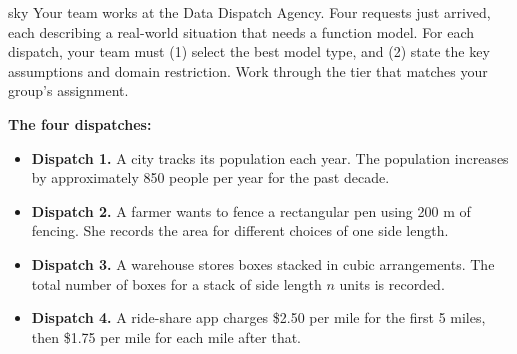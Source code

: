 \documentclass[10pt]{article}
\begin{document}
\namepartnerperiod

\vspace{0.08in}

\begin{scenariobox}{sky}
\small
Your team works at the Data Dispatch Agency. Four requests just arrived, each describing a
real-world situation that needs a function model. For each dispatch, your team must (1) select
the best model type, and (2) state the key assumptions and domain restriction. Work through
the tier that matches your group's assignment.
\end{scenariobox}

\vspace{0.08in}

\textbf{The four dispatches:}

\begin{itemize}[itemsep=3pt]
  \item \textbf{Dispatch 1.} A city tracks its population each year. The population increases by
        approximately 850 people per year for the past decade.
  \item \textbf{Dispatch 2.} A farmer wants to fence a rectangular pen using 200 m of fencing.
        She records the area for different choices of one side length.
  \item \textbf{Dispatch 3.} A warehouse stores boxes stacked in cubic arrangements.
        The total number of boxes for a stack of side length $n$ units is recorded.
  \item \textbf{Dispatch 4.} A ride-share app charges \$2.50 per mile for the first 5 miles,
        then \$1.75 per mile for each mile after that.
\end{itemize}

\vspace{0.08in}
\end{document}
